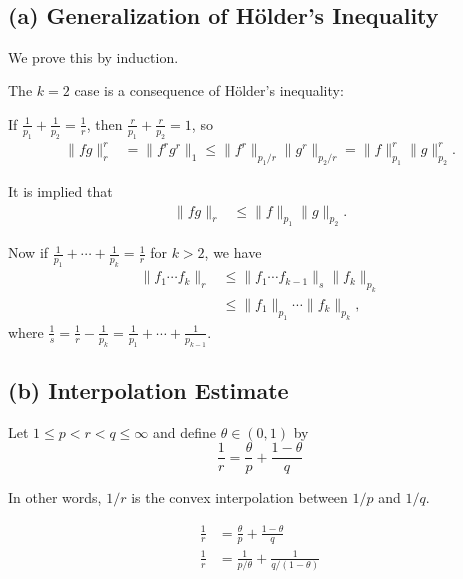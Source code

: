 \documentclass[UTF8,a4paper,10pt]{article}
\begin{document}
\begin{solution}\,

    \subsection*{(a) Generalization of Hölder's Inequality}


    We prove this by induction. 
    
    The \( k = 2 \) case is a consequence of H\"older's inequality:

    If \( \frac{1}{p_1} + \frac{1}{p_2} = \frac{1}{r} \), then \( \frac{r}{p_1} + \frac{r}{p_2} = 1 \), so
\begin{equation*}
  \begin{aligned}
    \|fg\|_r^r &= \|f^r g^r\|_1 \leq \|f^r\|_{p_1/r} \|g^r\|_{p_2/r} = \|f\|_{p_1}^r \|g\|_{p_2}^r.
  \end{aligned}
\end{equation*}

It is implied that
\begin{equation*}
    \begin{aligned}
      \|fg\|_r &\leq \|f\|_{p_1}\|g\|_{p_2}.
    \end{aligned}
  \end{equation*}

Now if \( \frac{1}{p_1} + \cdots + \frac{1}{p_k} = \frac{1}{r} \) for \( k > 2 \), we have
\begin{equation*}
  \begin{aligned}
    \|f_1 \cdots f_k\|_r &\leq \|f_1 \cdots f_{k-1}\|_s \|f_k\|_{p_k} \\
    &\leq \|f_1\|_{p_1} \cdots \|f_k\|_{p_k},
  \end{aligned}
\end{equation*}
where \( \frac{1}{s} = \frac{1}{r} - \frac{1}{p_k} = \frac{1}{p_1} + \cdots + \frac{1}{p_{k-1}} \).

\subsection*{(b) Interpolation Estimate}


Let $1 \leq p < r < q \leq \infty$ and define $\theta \in (0, 1)$ by
        \[
        \frac{1}{r} = \frac{\theta}{p} + \frac{1 - \theta}{q}
        \]




In other words, \(1/r\) is the convex interpolation between \(1/p\) and \(1/q\). 

\begin{equation*}
  \begin{aligned}
    \frac{1}{r} &= \frac{\theta}{p} + \frac{1 - \theta}{q}\\
    \frac{1}{r} &= \frac{1}{p/\theta} + \frac{1}{q/(1 - \theta)}
  \end{aligned}
\end{equation*}


\end{solution}
\end{document}
